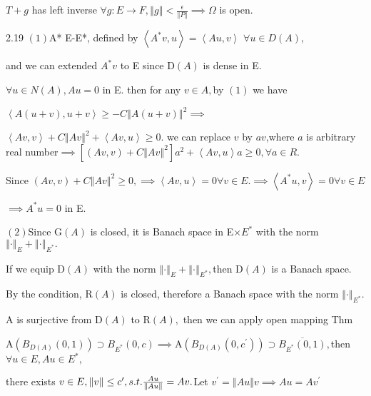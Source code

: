 \documentclass{article}
\begin{document}
$T+g$ has left inverse $\forall g:E\rightarrow F,\left\Vert g\right\Vert <%
\frac{\epsilon }{\left\Vert P\right\Vert }\implies \Omega $ is open.

2.19 $\left( 1\right) $A* E-\TEXTsymbol{>}E*, defined by $\left\langle
A^{\ast }v,u\right\rangle =\left\langle Au,v\right\rangle $ $\forall u\in
D\left( A\right) ,$ 

and we can extended $A^{\ast }v$ to E since D$\left( A\right) $ is dense in
E. 

$\forall u\in N\left( A\right) ,Au=0$ in E. then for any $v\in A,$by $\left(
1\right) $ we have

$\left\langle A\left( u+v\right) ,u+v\right\rangle \geq -C\left\Vert A\left(
u+v\right) \right\Vert ^{2}\implies $

$\left\langle Av,v\right\rangle +C\left\Vert Av\right\Vert ^{2}+\left\langle
Av,u\right\rangle \geq 0.$ we can replace $v$ by $av$,where $a$ is arbitrary
real number$\implies \left[ \left( Av,v\right) +C\left\Vert Av\right\Vert
^{2}\right] a^{2}+\left\langle Av,u\right\rangle a\geq 0,\forall a\in R.$

Since $\left( Av,v\right) +C\left\Vert Av\right\Vert ^{2}\geq 0,\implies
\left\langle Av,u\right\rangle =0\forall v\in E.\implies \left\langle
A^{\ast }u,v\right\rangle =0\forall v\in E$

$\implies A^{\ast }u=0$ in E.

$\left( 2\right) $Since G$\left( A\right) $ is closed, it is Banach space in
E$\times E^{\ast }$ with the norm $\left\Vert \cdot \right\Vert
_{E}+\left\Vert \cdot \right\Vert _{E^{\ast }}.$

If we equip D$\left( A\right) $ with the norm $\left\Vert \cdot \right\Vert
_{E}+\left\Vert \cdot \right\Vert _{E^{\ast }},$then D$\left( A\right) $ is
a Banach space.

By the condition, R$\left( A\right) $ is closed, therefore a Banach space
with the norm $\left\Vert \cdot \right\Vert _{E^{\ast }}.$

A is surjective from D$\left( A\right) $ to R$\left( A\right) ,$ then we can
apply open mapping Thm 

A$\left( B_{D\left( A\right) }\left( 0,1\right) \right) \supset B_{E^{\ast
}}\left( 0,c\right) \implies $A$\left( B_{D\left( A\right) }\left(
0,c^{\prime }\right) \right) \supset \overline{B_{E^{\ast }}\left(
0,1\right) },$then $\forall u\in E,Au\in E^{\ast },$

there exists $v\in E,\left\Vert v\right\Vert \leq c^{\prime },s.t.\frac{Au}{%
\left\Vert Au\right\Vert }=Av.$Let $v^{\prime }=\left\Vert Au\right\Vert
v\implies Au=Av^{\prime }$
\end{document}
